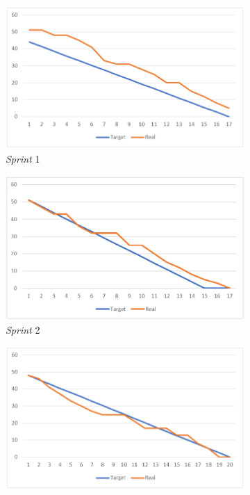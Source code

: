 \begin{figure}[hbtp]
\begin{subfigure}{.5\textwidth}
    \includegraphics[width=\linewidth]{figuras/sprint1.png}
    \caption{\textit{Sprint} 1}
    \label{fig:sprint1}
\end{subfigure}
\begin{subfigure}{.5\textwidth}
    \includegraphics[width=\linewidth]{figuras/sprint2.png}
    \caption{\textit{Sprint} 2}
    \label{fig:sprint2}
\end{subfigure}
\begin{subfigure}{.5\textwidth}
    \includegraphics[width=\linewidth]{figuras/sprint3.png}

\end{subfigure}
\end{figure}
